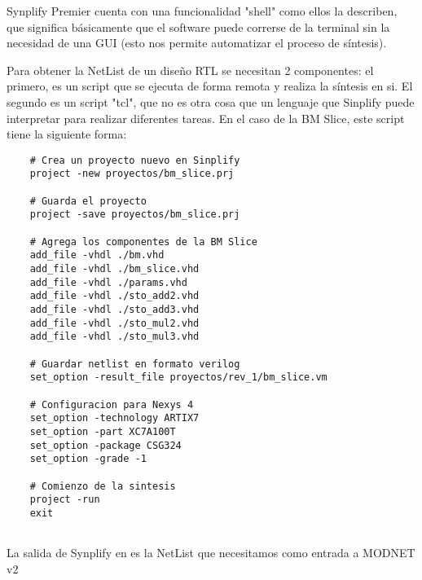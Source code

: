 Synplify Premier cuenta con una funcionalidad "shell" como ellos la describen, que significa básicamente que el software puede correrse de la terminal sin la necesidad de una GUI (esto nos permite automatizar el proceso de síntesis).

Para obtener la NetList de un diseño RTL se necesitan 2 componentes: el primero, es un script que se ejecuta de forma remota y realiza la síntesis en si. El segundo es un script "tcl", que no es otra cosa que un lenguaje que Sinplify puede interpretar para realizar diferentes tareas. En el caso de la BM Slice, este script tiene la siguiente forma: \break


\begin{lstlisting}
    # Crea un proyecto nuevo en Sinplify
    project -new proyectos/bm_slice.prj

    # Guarda el proyecto
    project -save proyectos/bm_slice.prj

    # Agrega los componentes de la BM Slice 
    add_file -vhdl ./bm.vhd
    add_file -vhdl ./bm_slice.vhd
    add_file -vhdl ./params.vhd
    add_file -vhdl ./sto_add2.vhd
    add_file -vhdl ./sto_add3.vhd
    add_file -vhdl ./sto_mul2.vhd
    add_file -vhdl ./sto_mul3.vhd

    # Guardar netlist en formato verilog 
    set_option -result_file proyectos/rev_1/bm_slice.vm

    # Configuracion para Nexys 4
    set_option -technology ARTIX7
    set_option -part XC7A100T
    set_option -package CSG324
    set_option -grade -1

    # Comienzo de la sintesis
    project -run
    exit    
    
\end{lstlisting}

La salida de Synplify en  es la NetList que necesitamos como entrada a MODNET v2